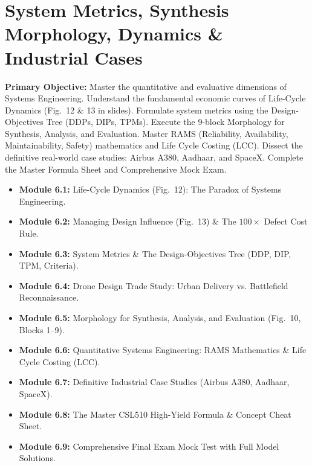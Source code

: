 \chapter{System Metrics, Synthesis Morphology, Dynamics \& Industrial Cases}
\label{chap:day6}

\begin{tcolorbox}[colback=sePrimary!5!white,colframe=sePrimary,title={\sffamily \textbf{DAY 6 CURRICULUM OVERVIEW \& LEARNING TARGETS}}]
\small
\textbf{Primary Objective:} Master the quantitative and evaluative dimensions of Systems Engineering. Understand the fundamental economic curves of Life-Cycle Dynamics (Fig.~12 \& 13 in slides). Formulate system metrics using the Design-Objectives Tree (DDPs, DIPs, TPMs). Execute the 9-block Morphology for Synthesis, Analysis, and Evaluation. Master RAMS (Reliability, Availability, Maintainability, Safety) mathematics and Life Cycle Costing (LCC). Dissect the definitive real-world case studies: Airbus A380, Aadhaar, and SpaceX. Complete the Master Formula Sheet and Comprehensive Mock Exam.
\begin{itemize}[leftmargin=1.5em, itemsep=2pt]
    \item \textbf{Module 6.1:} Life-Cycle Dynamics (Fig.~12): The Paradox of Systems Engineering.
    \item \textbf{Module 6.2:} Managing Design Influence (Fig.~13) \& The $100\times$ Defect Cost Rule.
    \item \textbf{Module 6.3:} System Metrics \& The Design-Objectives Tree (DDP, DIP, TPM, Criteria).
    \item \textbf{Module 6.4:} Drone Design Trade Study: Urban Delivery vs. Battlefield Reconnaissance.
    \item \textbf{Module 6.5:} Morphology for Synthesis, Analysis, and Evaluation (Fig.~10, Blocks 1--9).
    \item \textbf{Module 6.6:} Quantitative Systems Engineering: RAMS Mathematics \& Life Cycle Costing (LCC).
    \item \textbf{Module 6.7:} Definitive Industrial Case Studies (Airbus A380, Aadhaar, SpaceX).
    \item \textbf{Module 6.8:} The Master CSL510 High-Yield Formula \& Concept Cheat Sheet.
    \item \textbf{Module 6.9:} Comprehensive Final Exam Mock Test with Full Model Solutions.
\end{itemize}
\end{tcolorbox}

